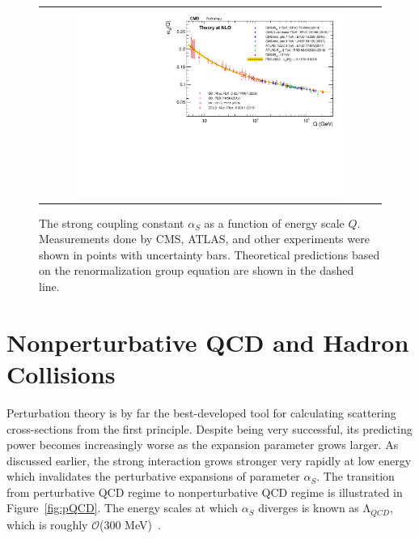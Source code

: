 \begin{figure}[tbh!]
 \begin{center}
 \begin{tabular}{c}
 \includegraphics[width=0.8\textwidth]{figures/Part1/QCD/alphaS}
 \end{tabular}
 \caption{The strong coupling constant $\alpha_{S}$ as a function of energy scale $Q$. Measurements done by \ac{CMS}, \ac{ATLAS}, and other experiments were shown in points with uncertainty bars. Theoretical predictions based on the renormalization group equation are shown in the dashed line.~\cite{cms:twiki}}
 \label{fig:alphaS}
 \end{center}
\end{figure}

\section{Nonperturbative QCD and Hadron Collisions}
\label{sec:Collision}

Perturbation theory is by far the best-developed tool for calculating scattering cross-sections from the first principle. Despite being very successful, its predicting power becomes increasingly worse as the expansion parameter grows larger. As discussed earlier, the strong interaction grows stronger very rapidly at low energy which invalidates the perturbative expansions of parameter $\alpha_{S}$. The transition from perturbative \ac{QCD} regime to nonperturbative \ac{QCD} regime is illustrated in Figure~\ref{fig:pQCD}. The energy scales at which $\alpha_{S}$ diverges is known as $\mathrm{\Lambda}_{QCD}$, which is roughly $\mathcal{O}$(300 MeV)~\cite{Deur:2016tte}.

